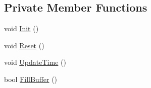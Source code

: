\subsection*{Private Member Functions}
\begin{DoxyCompactItemize}
\item 
void \hyperlink{classapollo_1_1cyber_1_1record_1_1RecordViewer_afef5a007901d706a60846215c4ec425b}{Init} ()
\item 
void \hyperlink{classapollo_1_1cyber_1_1record_1_1RecordViewer_a84fd2f304977915fca9ff67699cb2d64}{Reset} ()
\item 
void \hyperlink{classapollo_1_1cyber_1_1record_1_1RecordViewer_a7287a016645e55ac43fd3e9f97a1171c}{Update\-Time} ()
\item 
bool \hyperlink{classapollo_1_1cyber_1_1record_1_1RecordViewer_acf64f4fef9ae3e2c32648cfd46433519}{Fill\-Buffer} ()
\end{DoxyCompactItemize}
